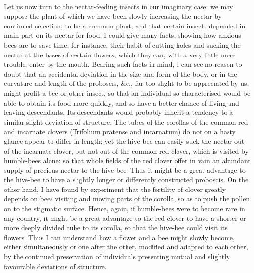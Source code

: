 \documentclass{article}
\begin{document}
\\
Let us now turn to the nectar-feeding insects in our imaginary case: we may suppose the plant of which we have been slowly increasing the nectar by continued selection, to be a common plant; and that certain insects depended in main part on its nectar for food. I could give many facts, showing how anxious bees are to save time; for instance, their habit of cutting holes and sucking the nectar at the bases of certain flowers, which they can, with a very little more trouble, enter by the mouth. Bearing such facts in mind, I can see no reason to doubt that an accidental deviation in the size and form of the body, or in the curvature and length of the proboscis, \&c., far too slight to be appreciated by us, might profit a bee or other insect, so that an individual so characterised would be able to obtain its food more quickly, and so have a better chance of living and leaving descendants. Its descendants would probably inherit a tendency to a similar slight deviation of structure. The tubes of the corollas of the common red and incarnate clovers (Trifolium pratense and incarnatum) do not on a hasty glance appear to differ in length; yet the hive-bee can easily suck the nectar out of the incarnate clover, but not out of the common red clover, which is visited by humble-bees alone; so that whole fields of the red clover offer in vain an abundant supply of precious nectar to the hive-bee. Thus it might be a great advantage to the hive-bee to have a slightly longer or differently constructed proboscis. On the other hand, I have found by experiment that the fertility of clover greatly depends on bees visiting and moving parts of the corolla, so as to push the pollen on to the stigmatic surface. Hence, again, if humble-bees were to become rare in any country, it might be a great advantage to the red clover to have a shorter or more deeply divided tube to its corolla, so that the hive-bee could visit its flowers. Thus I can understand how a flower and a bee might slowly become, either simultaneously or one after the other, modified and adapted to each other, by the continued preservation of individuals presenting mutual and slightly favourable deviations of structure.\\
\end{document}
